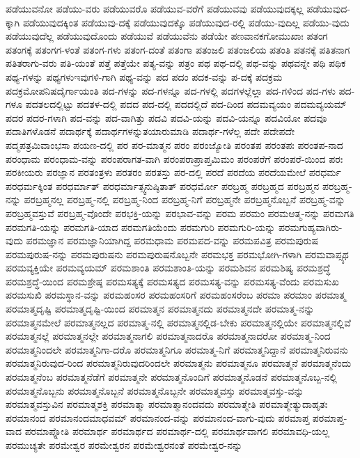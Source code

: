 {ಪಡೆಯುವನೋ
ಪಡೆಯು-ವರು
ಪಡೆಯುವರೊ
ಪಡೆಯುವ-ವರೆಗೆ
ಪಡೆಯುವವು
ಪಡೆಯುವುದಕ್ಕಲ್ಲ
ಪಡೆಯುವುದ-ಕ್ಕಾಗಿ
ಪಡೆಯುವುದಕ್ಕಿಂತ
ಪಡೆಯುವು-ದಕ್ಕೆ
ಪಡೆಯುವುದಕ್ಕೊ
ಪಡೆಯುವುದ-ರಲ್ಲಿ
ಪಡೆಯು-ವುದಿಲ್ಲ
ಪಡೆಯು-ವುದು
ಪಡೆಯುವುದೆಲ್ಲ
ಪಡೆಯುವುದೊಂದು
ಪಡೆಯುವೆ
ಪಡೆಯುವೆನು
ಪಡೆಯೇ
ಪಣವಾನಕಗೋಮುಖಾಃ
ಪತಂಗ
ಪತಂಗಕ್ಕೆ
ಪತಂಗಗ-ಳಂತೆ
ಪತಂಗ-ಗಳು
ಪತಂಗ-ದಂತೆ
ಪತಂಗಾ
ಪತಂಜಲಿ
ಪತಂಜಲಿಯ
ಪತಂತಿ
ಪತನಕ್ಕೆ
ಪತಿತನಾಗ
ಪತಿತರಾಗು-ವರು
ಪತಿ-ಯಂತೆ
ಪತ್ತೆ
ಪತ್ತೆಯೇ
ಪತ್ಯ-ವನ್ನು
ಪತ್ರಂ
ಪಥ
ಪಥ-ದಲ್ಲಿ
ಪಥ-ವನ್ನು
ಪಥವನ್ನೇ
ಪಥಿ
ಪಥಿಕ
ಪಥ್ಯ-ಗಳನ್ನು
ಪಥ್ಯಗಳುಇವುಗಳಿ-ಗಾಗಿ
ಪಥ್ಯ-ವನ್ನು
ಪದ
ಪದಂ
ಪದಕ-ವನ್ನು
ಪ-ದಕ್ಕೆ
ಪದಕ್ರಮ
ಪದಕ್ರಮೋಪನಿಷದೈರ್ಗಾಯಂತಿ
ಪದ-ಗಳನ್ನು
ಪದ-ಗಳನ್ನೂ
ಪದ-ಗಳಲ್ಲಿ
ಪದಗಳಲ್ಲೆಲ್ಲಾ
ಪದ-ಗಳಿಂದ
ಪದ-ಗಳು
ಪದ-ಗಳೂ
ಪದತಲದಲ್ಲಿಟ್ಟು
ಪದತಳ-ದಲ್ಲಿ
ಪದದ
ಪದ-ದಲ್ಲಿ
ಪದದಲ್ಲಿದೆ
ಪದ-ದಿಂದ
ಪದಮವ್ಯಯಂ
ಪದಮವ್ಯಯಮ್
ಪದರ
ಪದರ-ಗಳಾಗಿ
ಪದ-ವನ್ನು
ಪದ-ವಾಗಿತ್ತು
ಪದವಿ
ಪದವಿ-ಯನ್ನು
ಪದವಿ-ಯನ್ನೂ
ಪದವಿಯೋ
ಪದವೂ
ಪದಾತಿಗಳೊಡನೆ
ಪದಾರ್ಥಕ್ಕೆ
ಪದಾರ್ಥಗಳನ್ನುತಯಾರುಮಾಡಿ
ಪದಾರ್ಥ-ಗಳೆಲ್ಲ
ಪದೇ
ಪದೇಪದೇ
ಪದ್ಮಪತ್ರಮಿವಾಂಭಸಾ
ಪಯಣ-ದಲ್ಲಿ
ಪರ
ಪರ-ಮಾತ್ಮನ
ಪರಂ
ಪರಂಜ್ಯೋತಿ
ಪರಂತಪ
ಪರಂತಪಃ
ಪರಂತಪ-ನಾದ
ಪರಂಧಾಮ
ಪರಂಧಾಮ-ವನ್ನು
ಪರಂಪರಾಗತ-ವಾಗಿ
ಪರಂಪರಾಪ್ರಾಪ್ತಮಿಮಂ
ಪರಂಪರೆಗೆ
ಪರಂಪರೆ-ಯಿಂದ
ಪರಃ
ಪರಕೀಯರು
ಪರಜ್ಞಾನ
ಪರತಂತ್ರಳು
ಪರತರಂ
ಪರತಸ್ತು
ಪರ-ದಲ್ಲಿ
ಪರದೆ
ಪರದೆಯ
ಪರದೆಯಮೇಲೆ
ಪರಧರ್ಮ
ಪರಧರ್ಮಕ್ಕಿಂತ
ಪರಧರ್ಮಾತ್
ಪರಧರ್ಮಾತ್ಸ್ವನುಷ್ಠಿತಾತ್
ಪರಧರ್ಮೋ
ಪರಬ್ರಹ್ಮ
ಪರಬ್ರಹ್ಮದ
ಪರಬ್ರಹ್ಮನ
ಪರಬ್ರಹ್ಮ-ನನ್ನು
ಪರಬ್ರಹ್ಮನಲ್ಲ
ಪರಬ್ರಹ್ಮ-ನಲ್ಲಿ
ಪರಬ್ರಹ್ಮ-ನಿಂದ
ಪರಬ್ರಹ್ಮ-ನಿಗೆ
ಪರಬ್ರಹ್ಮನೇ
ಪರಬ್ರಹ್ಮನೊಬ್ಬನೆ
ಪರಬ್ರಹ್ಮ-ವನ್ನು
ಪರಬ್ರಹ್ಮವಸ್ತುವೆ
ಪರಬ್ರಹ್ಮ-ವೊಂದೇ
ಪರಭಕ್ತಿ-ಯನ್ನು
ಪರಭಾವ-ವನ್ನು
ಪರಮ
ಪರಮಂ
ಪರಮಆತ್ಮ-ನನ್ನು
ಪರಮಗತಿ
ಪರಮಗತಿ-ಯನ್ನು
ಪರಮಗತಿ-ಯಾದ
ಪರಮಗತಿಯೆಂದು
ಪರಮಗುರಿ
ಪರಮಗುರಿ-ಯನ್ನು
ಪರಮಗುಹ್ಯವಾಗಿರು-ವುದು
ಪರಮಜ್ಞಾನ
ಪರಮಜ್ಞಾನಿಯಾಗಿದ್ದ
ಪರಮಧಾಮ
ಪರಮಪದ-ವನ್ನು
ಪರಮಪವಿತ್ರ
ಪರಮಪುರುಷ
ಪರಮಪುರುಷ-ನನ್ನು
ಪರಮಪುರುಷನು
ಪರಮಪುರುಷನೊಬ್ಬನೇ
ಪರಮಭಕ್ತ
ಪರಮಭೋಗಿ-ಗಳಾಗಿ
ಪರಮವಾಪ್ಸ್ಯಥ
ಪರಮವ್ಯಕ್ತಿಯೇ
ಪರಮವ್ಯಯಮ್
ಪರಮಶಾಂತಿ
ಪರಮಶಾಂತಿ-ಯನ್ನು
ಪರಮಶಿವನ
ಪರಮಶಿಷ್ಯ
ಪರಮಶ್ರದ್ಧೆ
ಪರಮಶ್ರದ್ಧೆ-ಯಿಂದ
ಪರಮಶ್ರೇಷ್ಠ
ಪರಮಸತ್ಯಕ್ಕೆ
ಪರಮಸತ್ಯದ
ಪರಮಸತ್ಯ-ವನ್ನು
ಪರಮಸತ್ಯ-ವೆಂದು
ಪರಮಸುಖ
ಪರಮಸುಖಿ
ಪರಮಸ್ಥಾನ-ವನ್ನು
ಪರಮಹಂಸರ
ಪರಮಹಂಸರಿಗೆ
ಪರಮಹಂಸರೆಂಬ
ಪರಮಾ
ಪರಮಾಂ
ಪರಮಾತ್ಮ
ಪರಮಾತ್ಮದೃಷ್ಟಿ
ಪರಮಾತ್ಮದೃಷ್ಟಿ-ಯಿಂದ
ಪರಮಾತ್ಮನ
ಪರಮಾತ್ಮನದು
ಪರಮಾತ್ಮನದೇ
ಪರಮಾತ್ಮ-ನನ್ನು
ಪರಮಾತ್ಮನಮೇಲೆ
ಪರಮಾತ್ಮನಲ್ಲದ
ಪರಮಾತ್ಮ-ನಲ್ಲಿ
ಪರಮಾತ್ಮನಲ್ಲಿಡ-ಬೇಕು
ಪರಮಾತ್ಮನಲ್ಲಿಯೇ
ಪರಮಾತ್ಮನಲ್ಲಿವೆ
ಪರಮಾತ್ಮನಲ್ಲೆ
ಪರಮಾತ್ಮನಲ್ಲೇ
ಪರಮಾತ್ಮನಾಗಲಿ
ಪರಮಾತ್ಮನಾದರೊ
ಪರಮಾತ್ಮನಾದರೋ
ಪರಮಾತ್ಮ-ನಿಂದ
ಪರಮಾತ್ಮನಿಂದಲೇ
ಪರಮಾತ್ಮನಿಗಾ-ದರೊ
ಪರಮಾತ್ಮನಿಗೂ
ಪರಮಾತ್ಮ-ನಿಗೆ
ಪರಮಾತ್ಮನಿದ್ದಾನೆ
ಪರಮಾತ್ಮನಿರುವನು
ಪರಮಾತ್ಮನಿರುವುದ-ರಿಂದ
ಪರಮಾತ್ಮನಿರುವುದರಿಂದಲೇ
ಪರಮಾತ್ಮನು
ಪರಮಾತ್ಮನೂ
ಪರಮಾತ್ಮನೆ
ಪರಮಾತ್ಮನೆಂದು
ಪರಮಾತ್ಮನೆಂಬ
ಪರಮಾತ್ಮನೆಡೆಗೆ
ಪರಮಾತ್ಮನೇ
ಪರಮಾತ್ಮನೊಂದಿಗೆ
ಪರಮಾತ್ಮನೊಡನೆ
ಪರಮಾತ್ಮನೊಬ್ಬ-ನಲ್ಲಿ
ಪರಮಾತ್ಮನೊಬ್ಬನು
ಪರಮಾತ್ಮನೊಬ್ಬನೆ
ಪರಮಾತ್ಮನೊಬ್ಬನೇ
ಪರಮಾತ್ಮವಸ್ತು
ಪರಮಾತ್ಮವಸ್ತು-ವನ್ನು
ಪರಮಾತ್ಮವಸ್ತುವಿನ
ಪರಮಾತ್ಮಶಕ್ತಿ
ಪರಮಾತ್ಮಾ
ಪರಮಾತ್ಮಾನಂದವದು
ಪರಮಾತ್ಮೇತಿ
ಪರಮಾತ್ಮೇತ್ಯುದಾಹೃತಃ
ಪರಮಾನಂದ
ಪರಮಾನಂದಮಾಧವಮ್
ಪರಮಾನಂದ-ವನ್ನು
ಪರಮಾನಂದ-ವಾಗು-ವುದು
ಪರಮಾಪ್ತ
ಪರಮಾಪ್ತ-ವಾದ
ಪರಮಾಪ್ನೋತಿ
ಪರಮಾರ್ಥ
ಪರಮಾರ್ಥದ
ಪರಮಾರ್ಥ-ದಲ್ಲಿ
ಪರಮಾರ್ಥವಾಗಲಿ
ಪರಮಾವಧಿ-ಯಲ್ಲ
ಪರಮುಚ್ಯತೇ
ಪರಮೇಶ್ವರ
ಪರಮೇಶ್ವರನ
ಪರಮೇಶ್ವರನಂತೆ
ಪರಮೇಶ್ವರ-ನನ್ನು
}
